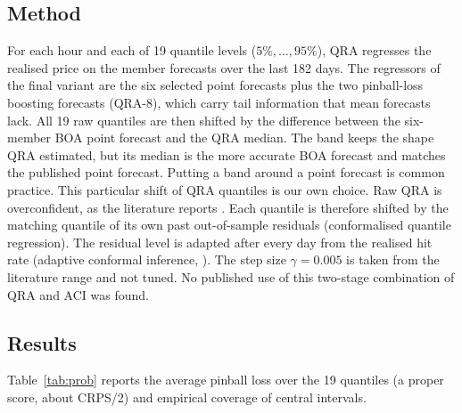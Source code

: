 \documentclass[11pt,a4paper]{article}
\begin{document}
\subsection{Method}
For each hour and each of 19 quantile levels ($5\%,\dots,95\%$), QRA \citep{nowotarski2015} regresses the realised price on the member forecasts over the last 182 days. The regressors of the final variant are the six selected point forecasts plus the two pinball-loss boosting forecasts (QRA-8), which carry tail information that mean forecasts lack. All 19 raw quantiles are then shifted by the difference between the six-member BOA point forecast and the QRA median. The band keeps the shape QRA estimated, but its median is the more accurate BOA forecast and matches the published point forecast. Putting a band around a point forecast is common practice. This particular shift of QRA quantiles is our own choice. Raw QRA is overconfident, as the literature reports \citep{kath2021}. Each quantile is therefore shifted by the matching quantile of its own past out-of-sample residuals (conformalised quantile regression). The residual level is adapted after every day from the realised hit rate (adaptive conformal inference, \citealp{gibbs2021,zaffran2022}). The step size $\gamma=0.005$ is taken from the literature range and not tuned. No published use of this two-stage combination of QRA and ACI was found.

\subsection{Results}
Table~\ref{tab:prob} reports the average pinball loss over the 19 quantiles (a proper score, about CRPS/2) and empirical coverage of central intervals.
\end{document}

